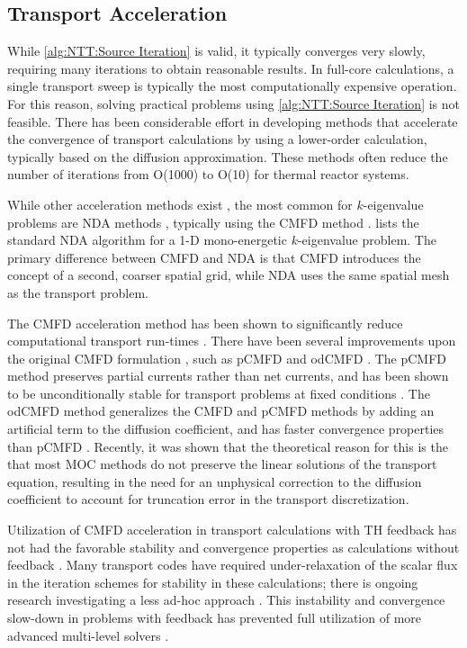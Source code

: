 {{    \subsection{Transport Acceleration}{\label{ssec:NTT:Transport Acceleration}
      While \cref{alg:NTT:Source Iteration} is valid, it typically converges very slowly, requiring many iterations to obtain reasonable results.
      In full-core calculations, a single transport sweep is typically the most computationally expensive operation. For this reason, solving practical problems using \cref{alg:NTT:Source Iteration} is not feasible.
      There has been considerable effort in developing methods that accelerate the convergence of transport calculations by using a lower-order calculation, typically based on the diffusion approximation.
      These methods often reduce the number of iterations from O(1000) to O(10) for thermal reactor systems.

      While other acceleration methods exist \cite{Hebert2017}, the most common for $k$-eigenvalue problems are \ac{NDA} methods \cite{Smith2002}, typically using the \ac{CMFD} method \cite{Smith1983}.
       lists the standard \ac{NDA} algorithm for a 1-D mono-energetic $k$-eigenvalue problem.
      The primary difference between \ac{CMFD} and \ac{NDA} is that \ac{CMFD} introduces the concept of a second, coarser spatial grid, while \ac{NDA} uses the same spatial mesh as the transport problem.

      The \ac{CMFD} acceleration method has been shown to significantly reduce computational transport run-times \cite{Smith2002,Anistratov2011,Collins2016}.
      There have been several improvements upon the original \ac{CMFD} formulation \cite{Smith1983}, such as p\ac{CMFD} \cite{Cho2002} and od\ac{CMFD} \cite{Zhu2016}.
      The p\ac{CMFD} method preserves partial currents rather than net currents, and has been shown to be unconditionally stable for transport problems at fixed conditions \cite{Cho2002}.
      The od\ac{CMFD} method generalizes the \ac{CMFD} and p\ac{CMFD} methods by adding an artificial term to the diffusion coefficient, and has faster convergence properties than p\ac{CMFD} \cite{Zhu2016}.
      Recently, it was shown that the theoretical reason for this is the that most \ac{MOC} methods do not preserve the linear solutions of the transport equation, resulting in the need for an unphysical correction to the diffusion coefficient to account for truncation error in the transport discretization.

      Utilization of \ac{CMFD} acceleration in transport calculations with \ac{TH} feedback has not had the favorable stability and convergence properties as calculations without feedback \cite{Kochunas2017}.
      Many transport codes have required under-relaxation of the scalar flux in the iteration schemes for stability in these calculations; there is ongoing research investigating a less ad-hoc approach \cite{Kochunas2017}.
      This instability and convergence slow-down in problems with feedback has prevented full utilization of more advanced multi-level solvers \cite{Kochunas2017,Yee2018a}.

}}}
